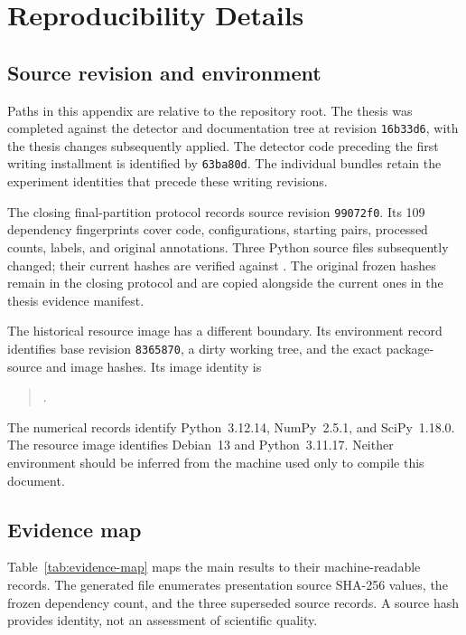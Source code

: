 \chapter{Reproducibility Details}
\label{app:reproducibility}
\section{Source revision and environment}

Paths in this appendix are relative to the repository root. The thesis
was completed against the detector and documentation tree at revision
\texttt{16b33d6}, with the thesis changes subsequently applied. The
detector code preceding the first writing installment is identified by
\texttt{63ba80d}. The individual bundles retain the experiment identities
that precede these writing revisions.

The closing final-partition protocol records source revision
\texttt{99072f0}. Its 109 dependency fingerprints cover code,
configurations, starting pairs, processed counts, labels, and original
annotations. Three Python source files subsequently changed; their
current hashes are verified against
. The original frozen
hashes remain in the closing protocol and are copied alongside the
current ones in the thesis evidence manifest.

The historical resource image has a different boundary. Its environment
record identifies base revision \texttt{8365870}, a dirty working tree,
and the exact package-source and image hashes. Its image identity is
\begin{quote}\footnotesize
{}.
\end{quote}
The numerical records identify Python~3.12.14, NumPy~2.5.1, and
SciPy~1.18.0. The resource image identifies Debian~13 and
Python~3.11.17. Neither environment should be inferred from the
machine used only to compile this document.

\section{Evidence map}
\label{app:evidence-map}

Table~\ref{tab:evidence-map} maps the main results to their machine-readable
records. The generated file
 enumerates presentation
source SHA-256 values, the frozen dependency count, and the three
superseded source records. A source hash provides identity, not an
assessment of scientific quality.

